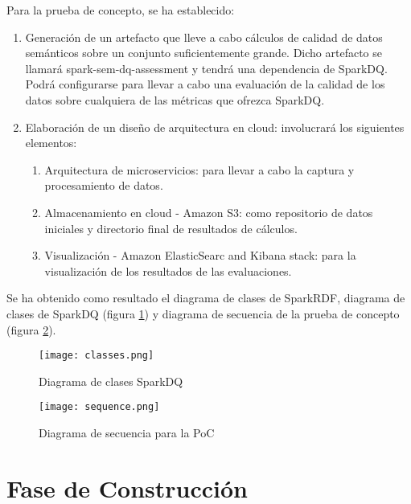 Para la prueba de concepto, se ha establecido:

\begin{enumerate}
\item Generación de un artefacto que lleve a cabo cálculos de calidad de datos
  semánticos sobre un conjunto suficientemente grande. Dicho artefacto se
  llamará spark-sem-dq-assessment y tendrá una dependencia de SparkDQ. Podrá
  configurarse para llevar a cabo una evaluación de la calidad de los datos
  sobre cualquiera de las métricas que ofrezca SparkDQ.
\item Elaboración de un diseño de arquitectura en cloud: involucrará los
  siguientes elementos:
  \begin{enumerate}
  \item Arquitectura de microservicios: para llevar a cabo la captura y
    procesamiento de datos. 
  \item Almacenamiento en cloud - Amazon S3: como repositorio de datos iniciales
    y directorio final de resultados de cálculos.
  \item Visualización - Amazon ElasticSearc and Kibana stack: para la
    visualización de los resultados de las evaluaciones.  
  \end{enumerate}
\end{enumerate}

Se ha obtenido como resultado el diagrama de clases de SparkRDF, diagrama de clases
de SparkDQ (figura \ref{fig:classes}) y diagrama de secuencia de la prueba de
concepto (figura \ref{fig:sequence}).

\begin{figure}[!h]
  \begin{center}
    \texttt{[image: classes.png]} 
    \caption{Diagrama de clases SparkDQ}
    \label{fig:classes}
  \end{center}
\end{figure}

\begin{figure}[!h]
  \begin{center}
    \texttt{[image: sequence.png]} 
    \caption{Diagrama de secuencia para la \acs{PoC}}
    \label{fig:sequence}
  \end{center}
\end{figure}


\section{Fase de Construcción}

